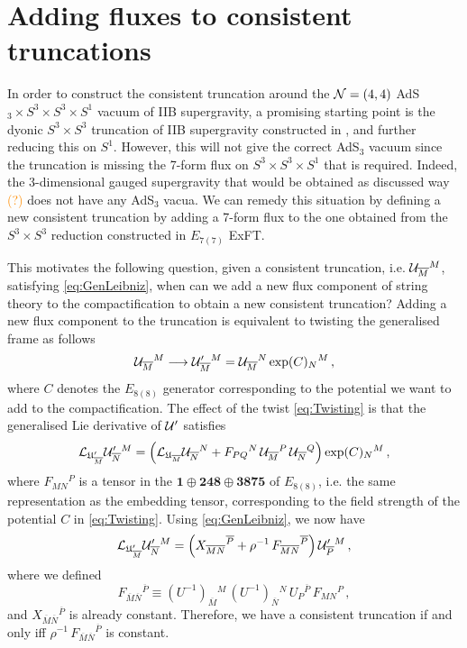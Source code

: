 \documentclass[a4paper, 11pt]{article}
\numberwithin{equation}{section}
\newcommand{\ff}[1]{\mathfrak{#1}}
\newcommand{\ov}[1]{\overline{#1}}
\newcommand{\EE}{\ensuremath{E_{8(8)}}\xspace}
\newcommand{\En}[1]{E_{#1(#1)}}
\newcommand{\+}{\oplus}
\newcommand{\gL}{\mathcal{L}}
\newcommand{\cU}{{\cal U}}
\newcommand{\UI}{\left(U^{-1}\right)}
\newcommand{\fl}[1]{\ov{#1}}
\newcommand{\CE}[1]{\textcolor{darkorange}{#1}}
\begin{document}
\section{Adding fluxes to consistent truncations} \label{s:AddFlux}
In order to construct the consistent truncation around the ${\cal N}=(4,4)$ AdS$_3 \times S^3 \times S^3 \times S^1$ vacuum of IIB supergravity, a promising starting point is the dyonic $S^3 \times S^3$ truncation of IIB supergravity constructed in \cite{Inverso:2016eet}, and further reducing this on $S^1$. However, this will not give the correct AdS$_3$ vacuum since the truncation is missing the 7-form flux on $S^3 \times S^3 \times S^1$ that is required. Indeed, the 3-dimensional gauged supergravity that would be obtained as discussed way \CE{(?)} does not have any AdS$_3$ vacua. We can remedy this situation by defining a new consistent truncation by adding a 7-form flux to the one obtained from the $S^3 \times S^3$ reduction constructed in $\En{7}$ ExFT.

This motivates the following question, given a consistent truncation, i.e. $\cU_{\fl{M}}{}^M$, satisfying \eqref{eq:GenLeibniz}, when can we add a new flux component of string theory to the compactification to obtain a new consistent truncation? Adding a new flux component to the truncation is equivalent to twisting the generalised frame as follows
\begin{equation} \label{eq:Twisting}
	\cU_{\fl{M}}{}^M \longrightarrow \cU'_{\fl{M}}{}^M = \cU_{\fl{M}}{}^N \exp(C)_N{}^M \,,
\end{equation}
where $C$ denotes the $\EE$ generator corresponding to the potential we want to add to the compactification. The effect of the twist \eqref{eq:Twisting} is that the generalised Lie derivative of $\cU'$ satisfies
\begin{equation}
	\gL_{\ff{U}'_{\fl{M}}} \cU'_{\fl{N}}{}^M = \left( \gL_{\ff{U}_{\fl{M}}} \cU_{\fl{N}}{}^N + F_{PQ}{}^N\, \cU_{\fl{M}}{}^P\, \cU_{\fl{N}}{}^Q \right) \exp(C)_N{}^M \,,
\end{equation}
where $F_{MN}{}^P$ is a tensor in the $\mathbf{1} \oplus \mathbf{248} \oplus \mathbf{3875}$ of $\EE$, i.e. the same representation as the embedding tensor, corresponding to the field strength of the potential $C$ in \eqref{eq:Twisting}. Using \eqref{eq:GenLeibniz}, we now have
\begin{equation}
	\gL_{\ff{U}'_{\fl{M}}} \cU'_{\fl{N}}{}^M = \left( X_{\fl{M}\fl{N}}{}^{\fl{P}} + \rho^{-1}\, F_{\fl{M}\fl{N}}{}^{\fl{P}} \right) \cU'_{\fl{P}}{}^M \,,
\end{equation}
where we defined
\begin{equation} \label{eq:FlatF}
	F_{\fl{M}\fl{N}}{}^{\fl{P}} \equiv \UI_{\fl{M}}{}^M\, \UI_{\fl{N}}{}^N\, U_P{}^{\fl{P}}\, F_{MN}{}^P \,,
\end{equation}
and $X_{\fl{M}\fl{N}}{}^{\fl{P}}$ is already constant. Therefore, we have a consistent truncation if and only iff $\rho^{-1}\, F_{\fl{M}\fl{N}}{}^{\fl{P}}$ is constant.
\end{document}
